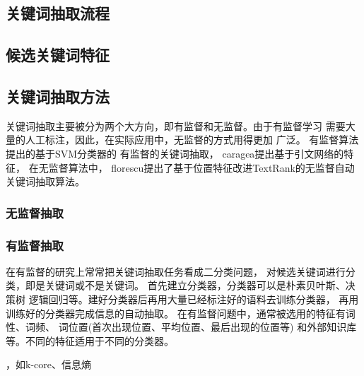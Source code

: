 \subsection{关键词抽取流程}


\subsection{候选关键词特征}


\subsection{关键词抽取方法}
关键词抽取主要被分为两个大方向，即有监督和无监督。由于有监督学习%
需要大量的人工标注，因此，在实际应用中，无监督的方式用得更加%
广泛。
有监督算法提出的基于SVM分类器的%
有监督的关键词抽取，%
caragea提出基于引文网络的特征，
在无监督算法中，
florescu提出了基于位置特征改进TextRank的无监督自动关键词抽取算法。

\subsubsection{无监督抽取}


\subsubsection{有监督抽取}
在有监督的研究上常常把关键词抽取任务看成二分类问题，%
对候选关键词进行分类，即是关键词或不是关键词。%
首先建立分类器，分类器可以是朴素贝叶斯、决策树%
逻辑回归等。建好分类器后再用大量已经标注好的语料去训练分类器，%
再用训练好的分类器完成信息的自动抽取。%
在有监督问题中，通常被选用的特征有词性、词频、%
词位置(首次出现位置、平均位置、最后出现的位置等)%
和外部知识库等。不同的特征适用于不同的分类器。



，如k-core、信息熵



